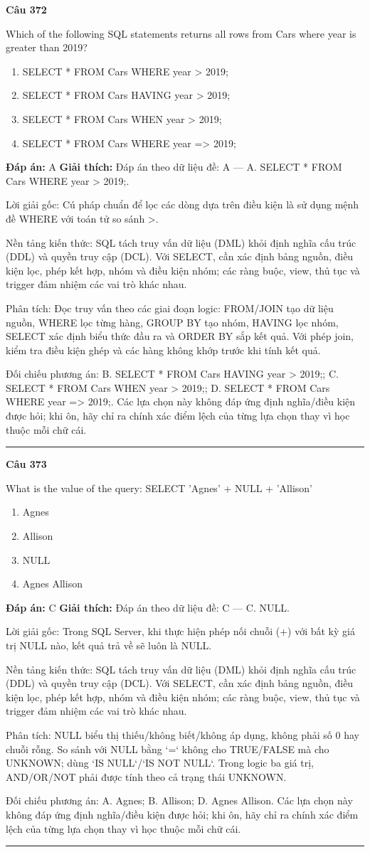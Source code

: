\documentclass[11pt,a4paper]{article}
\newenvironment{question}[1]{%
  \par\vspace{1em}\noindent\textbf{\large Câu #1}\par\vspace{0.4em}
}{%
  \par\vspace{1em}\hrule\vspace{0.6em}
}
\newenvironment{choices}{%
  \begin{enumerate}[label=\textbf{\Alph*.},leftmargin=2.2em,itemsep=2pt,topsep=3pt]
}{%
  \end{enumerate}
}
\newcommand{\choice}{\item}
\begin{document}
\begin{question}{372}
Which of the following SQL statements returns all rows from Cars where year is greater than 2019?
\begin{choices}
\choice SELECT * FROM Cars WHERE year > 2019;
\choice SELECT * FROM Cars HAVING year > 2019;
\choice SELECT * FROM Cars WHEN year > 2019;
\choice SELECT * FROM Cars WHERE year => 2019;
\end{choices}
\textbf{Đáp án:} A
\textbf{Giải thích:} Đáp án theo dữ liệu đề: A — A. SELECT * FROM Cars WHERE year > 2019;.

Lời giải gốc: Cú pháp chuẩn để lọc các dòng dựa trên điều kiện là sử dụng mệnh đề WHERE với toán tử so sánh >.

Nền tảng kiến thức: SQL tách truy vấn dữ liệu (DML) khỏi định nghĩa cấu trúc (DDL) và quyền truy cập (DCL). Với SELECT, cần xác định bảng nguồn, điều kiện lọc, phép kết hợp, nhóm và điều kiện nhóm; các ràng buộc, view, thủ tục và trigger đảm nhiệm các vai trò khác nhau.

Phân tích: Đọc truy vấn theo các giai đoạn logic: FROM/JOIN tạo dữ liệu nguồn, WHERE lọc từng hàng, GROUP BY tạo nhóm, HAVING lọc nhóm, SELECT xác định biểu thức đầu ra và ORDER BY sắp kết quả. Với phép join, kiểm tra điều kiện ghép và các hàng không khớp trước khi tính kết quả.

Đối chiếu phương án: B. SELECT * FROM Cars HAVING year > 2019;; C. SELECT * FROM Cars WHEN year > 2019;; D. SELECT * FROM Cars WHERE year => 2019;. Các lựa chọn này không đáp ứng định nghĩa/điều kiện được hỏi; khi ôn, hãy chỉ ra chính xác điểm lệch của từng lựa chọn thay vì học thuộc mỗi chữ cái.
\end{question}

\begin{question}{373}
What is the value of the query: SELECT 'Agnes' + NULL + 'Allison'
\begin{choices}
\choice Agnes
\choice Allison
\choice NULL
\choice Agnes Allison
\end{choices}
\textbf{Đáp án:} C
\textbf{Giải thích:} Đáp án theo dữ liệu đề: C — C. NULL.

Lời giải gốc: Trong SQL Server, khi thực hiện phép nối chuỗi (+) với bất kỳ giá trị NULL nào, kết quả trả về sẽ luôn là NULL.

Nền tảng kiến thức: SQL tách truy vấn dữ liệu (DML) khỏi định nghĩa cấu trúc (DDL) và quyền truy cập (DCL). Với SELECT, cần xác định bảng nguồn, điều kiện lọc, phép kết hợp, nhóm và điều kiện nhóm; các ràng buộc, view, thủ tục và trigger đảm nhiệm các vai trò khác nhau.

Phân tích: NULL biểu thị thiếu/không biết/không áp dụng, không phải số 0 hay chuỗi rỗng. So sánh với NULL bằng `=` không cho TRUE/FALSE mà cho UNKNOWN; dùng `IS NULL`/`IS NOT NULL`. Trong logic ba giá trị, AND/OR/NOT phải được tính theo cả trạng thái UNKNOWN.

Đối chiếu phương án: A. Agnes; B. Allison; D. Agnes Allison. Các lựa chọn này không đáp ứng định nghĩa/điều kiện được hỏi; khi ôn, hãy chỉ ra chính xác điểm lệch của từng lựa chọn thay vì học thuộc mỗi chữ cái.
\end{question}
\end{document}
